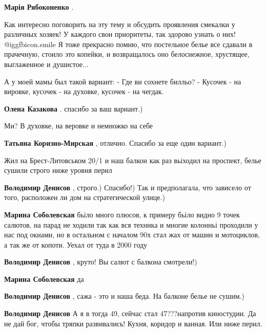\begin{itemize}
\begin{itemize}
\textbf{Марія Рябоконенко} . 

Как интересно поговорить на эту тему и обсудить проявления смекалки у различных
хозяек! У каждого свои приоритеты, так здорово узнать о них!  @igg{fbicon.smile}  Я тоже
прекрасно помню, что постельное белье все сдавали в прачечную, стоило это
копейки, и возвращалось оно белоснежное, хрустящее, выглаженное и душистое...

\end{itemize} %


А у моей мамы был такой вариант: - Где ви сохнете билльо? - Кусочек - на
вировке, кусочек - на духовке, кусочек - на чегдак.

\textbf{Олена Казакова} . спасибо за ваш вариант.)


Ми? В духовке, на веровке и немножко на себе

\textbf{Татьяна Коризно-Мирская} , отлично. Спасибо за еще один вариант.)

Жил на Брест-Литовськом 20/1 и наш балкон как раз вьіходил на проспект, белье сушили строго ниже уровня перил

\begin{itemize} %
\textbf{Володимир Денисов} , строго.) Спасибо!) Так и предполагала, что зависело от того, расположен ли дом на стратегической улице.)

\begin{itemize} %
\textbf{Марина Соболевская} бьіло много плюсов, к примеру бьіло видно 9 точек салютов, на парад не ходили так как вся техника и многие колонньі проходили у нас под окнами, но в остальном с началом 90х стал жах от машин и мотоциклов, а так же от копоти. Уехал от туда в 2000 году

\textbf{Володимир Денисов} , круто! Вы салют с балкона смотрели!)

\textbf{Марина Соболевская} да

\textbf{Володимир Денисов} , сажа - это и наша беда. На балконе белье не сушим.)
\end{itemize} %

\textbf{Володимир Денисов} А я в тогда 49, сейчас стал 47???напротив киностудии.
Да не дай бог, чтобы тряпки развивались!
Кухня, коридор и ванная.
Или ниже перил.


\end{itemize}
\end{itemize}
